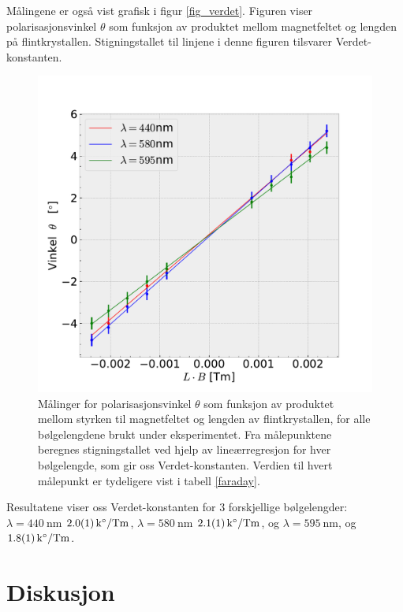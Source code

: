 \documentclass[%
 reprint,
 amsmath,amssymb,
 aps,
 norsk,
]{revtex4-1}
\begin{document}
Målingene er også vist grafisk i figur \vref{fig_verdet}. Figuren viser polarisasjonsvinkel $\theta$ som funksjon av produktet mellom magnetfeltet og lengden på flintkrystallen. Stigningstallet til linjene i denne figuren tilsvarer Verdet-konstanten.
\begin{figure}[ht!]
  \centering
  \includegraphics[scale=0.45]{faraday_effekt.pdf}
  \caption{Målinger for polarisasjonsvinkel $\theta$ som funksjon av produktet mellom styrken til magnetfeltet og lengden av flintkrystallen, for alle bølgelengdene brukt under eksperimentet. Fra målepunktene beregnes stigningstallet ved hjelp av lineærregresjon for hver bølgelengde, som gir oss Verdet-konstanten. Verdien til hvert målepunkt er tydeligere vist i tabell \vref{faraday}.}
  \label{fig_verdet}
\end{figure}
Resultatene viser oss Verdet-konstanten for $3$ forskjellige bølgelengder: $\lambda = \SI{440}{\nano\meter}$ $\SI{2.0\pm0.1}{\kilo\degree/\tesla\meter}$, $\lambda = \SI{580}{\nano\meter}$ $\SI{2.1\pm0.1}{\kilo\degree/\tesla\meter}$, og $\lambda = \SI{595}{\nano\meter}$,
 og $\SI{1.8\pm0.1}{\kilo\degree/\tesla\meter}$.
\section{Diskusjon}
\end{document}
